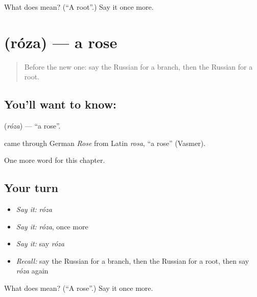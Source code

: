 \begin{tcolorbox}[breakable,colback=teal!4,colframe=teal!35!black,title={Before you move on}]
What does  mean? (\textquotedblleft{}A root\textquotedblright{}.) Say it once more.
\end{tcolorbox}
\section[\texorpdfstring{\ru{роза} (róza)}{роза (róza)}]{ (róza) — a rose}

\label{lesson:RU-C195-roza}



\begin{quote}
Before the new one: say the Russian for a branch, then the Russian for a root.
\end{quote}

\subsection*{You'll want to know: }
\textbf{} (\emph{róza}) — \textquotedblleft{}a rose\textquotedblright{}.

\begin{cousinweb}
\textbf{} came through German \emph{Rose} from Latin \emph{rosa}, \textquotedblleft{}a rose\textquotedblright{} (Vasmer).
\end{cousinweb}

\begin{grammarlens}[title={What you've built}]
One more word for this chapter.
\end{grammarlens}

\subsection*{Your turn}
\begin{itemize}
\raggedright
  \item \emph{Say it:} \emph{róza}
  \item \emph{Say it:} \emph{róza}, once more
  \item \emph{Say it:} say \emph{róza}
  \item \emph{Recall:} say the Russian for a branch, then the Russian for a root, then say \emph{róza} again
\end{itemize}

\begin{tcolorbox}[breakable,colback=teal!4,colframe=teal!35!black,title={Before you move on}]
What does  mean? (\textquotedblleft{}A rose\textquotedblright{}.) Say it once more.
\end{tcolorbox}
